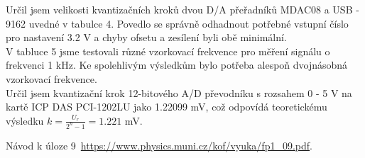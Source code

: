\documentclass[a4paper,11pt]{article}
\begin{document}
Určil jsem velikosti kvantizačních kroků dvou D/A přeřadníků MDAC08 a USB - 9162 uvedné v tabulce 4. Povedlo se správně odhadnout potřebné vstupní číslo pro nastavení 3.2 V a chyby ofsetu a zesílení byli obě minimální. \\

V tabluce 5 jsme testovali různé vzorkovací frekvence pro měření signálu o frekvenci 1 kHz. Ke spolehlivým výsledkům bylo potřeba alespoň dvojnásobná vzorkovací frekvence. \\

Určil jsem kvantizační krok 12-bitového A/D převodníku s rozsahem 0 - 5 V na kartě ICP DAS PCI-1202LU jako 1.22099 mV, což odpovídá teoretickému výsledku $k = \frac{U_r}{2^{n} -1}=1.221$ mV. \\


\begin{thebibliography}{0}
 Návod k úloze 9~\url{https://www.physics.muni.cz/kof/vyuka/fp1_09.pdf}.   
\end{thebibliography}
\end{document}
